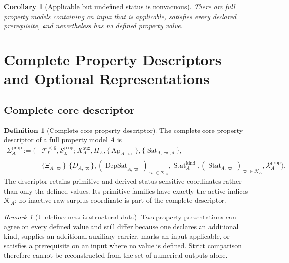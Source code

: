\documentclass[11pt]{article}
\newcommand{\FVI}{\mathcal F_{L}^{\le 6}}
\newcommand{\Sprop}{\mathcal S_{L}^{\mathrm{prop}}}
\newcommand{\Ap}{\operatorname{Ap}}
\newcommand{\DepSat}{\operatorname{DepSat}}
\newcommand{\Sat}{\operatorname{Sat}}
\newcommand{\Stat}{\operatorname{Stat}}
\newcommand{\PropRec}{\mathcal R^{\mathrm{prop}}}
\newtheorem{corollary}[theorem]{Corollary}
\theoremstyle{definition}
\newtheorem{definition}[theorem]{Definition}
\theoremstyle{remark}
\newtheorem{remark}[theorem]{Remark}
\begin{document}
\begin{corollary}[Applicable but undefined status is nonvacuous]
There are full property models containing an input that is applicable, satisfies every declared prerequisite, and nevertheless has no defined property value.
\end{corollary}

\section{Complete Property Descriptors and Optional Representations}
\label{sec:descriptor-representation}

\subsection{Complete core descriptor}

\begin{definition}[Complete core property descriptor]
\label{def:descriptor}
The complete core property descriptor of a full property model \(A\) is
\[
\begin{aligned}
\Sigma_A^{\mathrm{prop}}:=\bigl(&\FVI,\Sprop;
X_A^{\mathrm{aux}},\Pi_A,
\{\Ap_{A,\varpi}\},\{\Sat_{A,\varpi,d}\},\\
&\{\Xi_{A,\varpi}\},\{D_{A,\varpi}\},
(\DepSat_{A,\varpi})_{\varpi\in\mathcal K_A},
\Stat_A^{\mathrm{kind}},
(\Stat_{A,\varpi})_{\varpi\in\mathcal K_A},
\PropRec_A\bigr).
\end{aligned}
\]
The descriptor retains primitive and derived status-sensitive coordinates rather than only the defined values. Its primitive families have exactly the active indices \(\mathcal K_A\); no inactive raw-surplus coordinate is part of the complete descriptor.
\end{definition}

\begin{remark}[Undefinedness is structural data]
Two property presentations can agree on every defined value and still differ because one declares an additional kind, supplies an additional auxiliary carrier, marks an input applicable, or satisfies a prerequisite on an input where no value is defined.
Strict comparison therefore cannot be reconstructed from the set of numerical outputs alone.
\end{remark}

\end{document}
